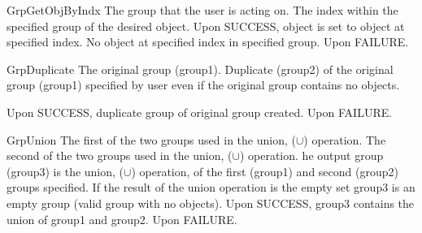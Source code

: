 \begin{prototype}{GrpGetObjByIndx}
	  {\pInput} {The group that the user is acting on.}
	     {\pInput} {The index within the specified group of the desired object.}
	 		{Upon SUCCESS, object is set to object at specified index.}
	 	{No object at specified index in specified group.}
	 		{Upon FAILURE.}
\end{prototype}
\begin{prototype}{GrpDuplicate}
		{\pInput}{The original group (group1).}
		{\pOutput}{Duplicate (group2) of the original group (group1) specified by user even if the original group contains no objects.}

	 	{Upon SUCCESS, duplicate group of original group created.}
	 	{Upon FAILURE.}
\end{prototype}

\begin{prototype}{GrpUnion}
		{\pInput}{The first of the two groups used in the union, ($\cup$) operation.}
		{\pInput}{The second of the two groups used in the union, ($\cup$) operation.}
		{\pOutput}{he output group (group3) is the union, ($\cup$) operation, of the first (group1) and second (group2) groups specified. If the result of the union operation is the empty set group3 is an empty group (valid group with no objects).}
	 	{Upon SUCCESS, group3 contains the union of group1 and group2.}
	 	{Upon FAILURE.}
\end{prototype}

